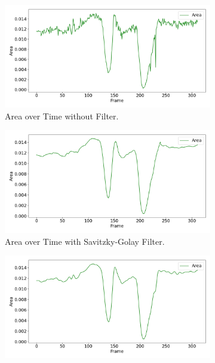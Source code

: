\documentclass[12pt,oneside]{book} %
\begin{document}
\begin{figure}[H]
    \centering
    \begin{subfigure}[t]{0.65\textwidth}
        \includegraphics[width=\textwidth]{figures/bbox_metrics/test_indoor1 (Raw Data)_area.png}
        \caption{Area over Time without Filter.}
        \label{fig:size-test-indoor1-raw}
    \end{subfigure}
    \hfill
    \begin{subfigure}[t]{0.65\textwidth}
        \includegraphics[width=\textwidth]{figures/bbox_metrics/test_indoor1 (Savgol Filter)_area.png}
        \caption{Area over Time with Savitzky-Golay Filter.}
        \label{fig:size-test-indoor1-savgol}
    \end{subfigure}
    \vfill
    \begin{subfigure}[t]{0.65\textwidth}
        \includegraphics[width=\textwidth]{figures/bbox_metrics/test_indoor1 (Gaussian Filter)_area.png}

\end{subfigure}
\end{figure}
\end{document}
